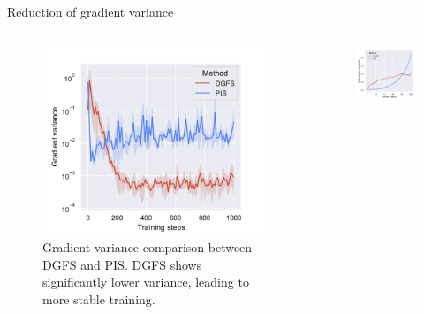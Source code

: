\documentclass[aspectratio=169,xcolor=dvipsnames]{beamer}
\begin{document}
\begin{frame}[t]{Reduction of gradient variance}
\footnotesize

\vspace{-0.75cm}
\begin{columns}[t]
\begin{column}{0.33\textwidth}
\begin{figure}
    \centering
    \includegraphics[width=\textwidth]{figures/grad_variance.png}
    \caption{Gradient variance comparison between DGFS and PIS. DGFS shows significantly lower variance, leading to more stable training.}
\end{figure}
\end{column}
\begin{column}{0.33\textwidth}
\begin{figure}
    \centering
    \includegraphics[width=\textwidth]{figures/drift.png}

\end{figure}
\end{column}
\end{columns}
\end{frame}
\end{document}
